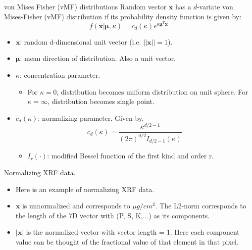 \documentclass[
]{beamer}
\begin{document}
\begin{frame}{von Mises Fisher (vMF) distributions}%
Random vector $\boldsymbol{x}$ has a $d$-variate von Mises-Fisher (vMF) distribution if its probability density function is given by:
$$f(\boldsymbol{x}|\boldsymbol{\mu}, \kappa) = c_d(\kappa)e^{\kappa\boldsymbol{\mu}^T\mathbf{x}}$$
\begin{itemize}
  \item $\boldsymbol{x}$: random d-dimensional unit vector (i.e. $||\boldsymbol{x}|| = 1$).
  \item $\boldsymbol{\mu}$: mean direction of distribution. Also a unit vector.
  \item $\kappa$: concentration parameter.
  \begin{itemize}
    \item For $\kappa = 0$, distribution becomes uniform distribution on unit sphere. For $\kappa = \infty$, distribution becomes single point.
  \end{itemize}
  \item $c_d(\kappa)$: normalizing parameter. Given by,
  $$c_d(\kappa) = \frac{\kappa^{d/2-1}}{(2\pi)^{d/2}I_{d/2-1}(\kappa)}$$
  \begin{itemize}
      \item $I_r(\cdot)$: modified Bessel function of the first kind and order r.
  \end{itemize}
\end{itemize}
\end{frame}

\begin{frame}{Normalizing XRF data.}
\centering
\begin{table}[]
\end{table}
\begin{itemize}
    \item Here is an example of normalizing XRF data. 
    \item $\boldsymbol{x}$ is unnormalized and corresponds to $\mu g / cm^2$. The L2-norm corresponds to the length of the 7D vector with (P, S, K,...) as its components.
    \item $|\boldsymbol{x}|$ is the normalized vector with vector length = 1. Here each component value can be thought of the fractional value of that element in that pixel.
\end{itemize}
\end{frame}
\end{document}
